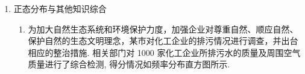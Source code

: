 \begin{enumerate}
\begin{enumerate}
\begin{jieda}
\begin{enumerate}
                所以成绩在 $\left\lbrack  {{45},{65}}\right\rbrack$ 的人数约为 ${30000} \times  {0.6827} = {20481}$ 人,
                
                由正态分布曲线的对称性可得: $P\left( {{35} \leq  X \leq  {75}}\right)  = P\left( {\mu  - {2\sigma } \leq  X \leq  \mu  + {2\sigma }}\right)  \approx  {0.9545}$ ,
                
                则 $P\left( {X > {75}}\right)  = \dfrac{1 - P\left( {{35} \leq  X \leq  {75}}\right) }{2} \approx  {0.0228}$ ,
                
                所以估计 75 分以上的人数约为 ${30000} \times  {0.0228} = {684}$ 人;
                
                \item 设该划线分为 $m$ ，由 $X \sim  N\left( {{55},{10}^{2}}\right)$ ，得 $\mu  = {55},\sigma  = {10}$ ，
                
                令 $\eta  = \dfrac{X - \mu }{\sigma } = \dfrac{X - {55}}{10} \geq  \dfrac{m - {55}}{10}$ ,
                
                由题意因为 $\eta  \sim  N\left( {0,1}\right) ,P\left( {\eta  < {0.8}}\right)  \approx  {0.75}$ ,
                
                所以 $P\left( {\eta  \geq  {0.8}}\right)  \approx  {0.25}$ ,所以 $\dfrac{m - {55}}{10} \approx  {0.8}$ ,
                
                所以 $m \approx  {63}$ .
            \end{enumerate}
        \end{jieda}
    \end{enumerate}
    \item 正态分布与其他知识综合
    \begin{enumerate}
        \item 为加大自然生态系统和环境保护力度，加强企业对尊重自然、顺应自然、保护自然的生态文明理念，某市对化工企业的排污情况进行调查，并出台相应的整治措施. 相关部门对 1000 家化工企业所排污水的质量及周围空气质量进行了综合检测, 得分情况如频率分布直方图所示.
        

\end{enumerate}
\end{enumerate}
